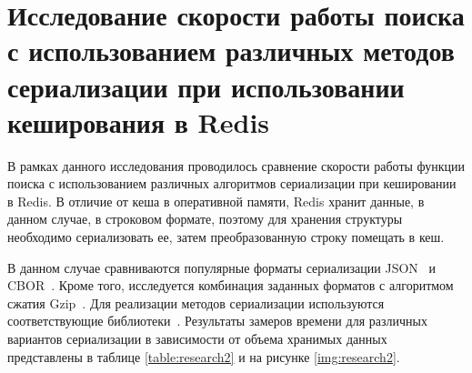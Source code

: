 \section{Исследование скорости работы поиска с использованием различных методов сериализации при использовании кеширования в Redis}

В рамках данного исследования проводилось сравнение скорости работы функции поиска с использованием различных алгоритмов сериализации при кешировании в Redis. В отличие от кеша в оперативной памяти, Redis хранит данные, в данном случае, в строковом формате, поэтому для хранения структуры необходимо сериализовать ее, затем преобразованную строку помещать в кеш.

В данном случае сравниваются популярные форматы сериализации JSON~\cite{json} и CBOR~\cite{cbor}. Кроме того, исследуется комбинация заданных форматов с алгоритмом сжатия Gzip~\cite{gzip}. Для реализации методов сериализации используются соответствующие библиотеки~\cite{json_doc, cbor_doc, gzip_doc}. Результаты замеров времени для различных вариантов сериализации в зависимости от объема хранимых данных представлены в таблице \ref{table:research2} и на рисунке \ref{img:research2}.

\newpage

